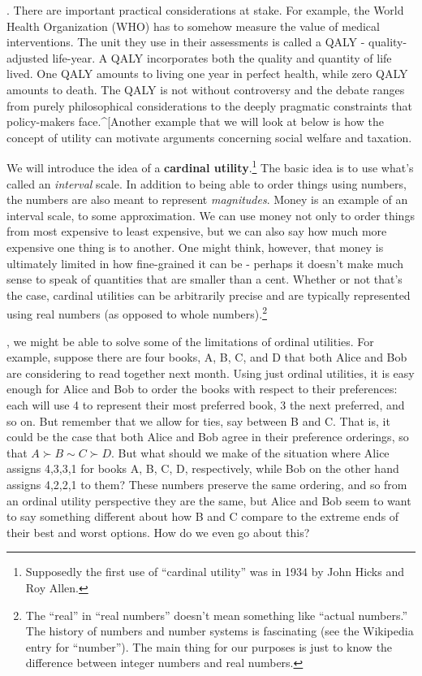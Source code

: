 \documentclass[]{tufte-book}
\begin{document}
. There are important practical considerations at stake. For example, the World Health Organization (WHO) has to somehow measure the value of medical interventions. The unit they use in their assessments is called a QALY - quality-adjusted life-year. A QALY incorporates both the quality and quantity of life lived. One QALY amounts to living one year in perfect health, while zero QALY amounts to death. The QALY is not without controversy and the debate ranges from purely philosophical considerations to the deeply pragmatic constraints that policy-makers face.\^{}{[}Another example that we will look at below is how the concept of utility can motivate arguments concerning social welfare and taxation.

We will introduce the idea of a \textbf{cardinal utility}.\footnote{Supposedly the first use of ``cardinal utility'' was in 1934 by John Hicks and Roy Allen.} The basic idea is to use what's called an \emph{interval} scale. In addition to being able to order things using numbers, the numbers are also meant to represent \emph{magnitudes}. Money is an example of an interval scale, to some approximation. We can use money not only to order things from most expensive to least expensive, but we can also say how much more expensive one thing is to another. One might think, however, that money is ultimately limited in how fine-grained it can be - perhaps it doesn't make much sense to speak of quantities that are smaller than a cent. Whether or not that's the case, cardinal utilities can be arbitrarily precise and are typically represented using real numbers (as opposed to whole numbers).\footnote{The ``real'' in ``real numbers'' doesn't mean something like ``actual numbers.'' The history of numbers and number systems is fascinating (see the Wikipedia entry for ``number''). The main thing for our purposes is just to know the difference between integer numbers and real numbers.}

, we might be able to solve some of the limitations of ordinal utilities. For example, suppose there are four books, A, B, C, and D that both Alice and Bob are considering to read together next month. Using just ordinal utilities, it is easy enough for Alice and Bob to order the books with respect to their preferences: each will use 4 to represent their most preferred book, 3 the next preferred, and so on. But remember that we allow for ties, say between B and C. That is, it could be the case that both Alice and Bob agree in their preference orderings, so that \(A\succ B\sim C \succ D\). But what should we make of the situation where Alice assigns 4,3,3,1 for books A, B, C, D, respectively, while Bob on the other hand assigns 4,2,2,1 to them? These numbers preserve the same ordering, and so from an ordinal utility perspective they are the same, but Alice and Bob seem to want to say something different about how B and C compare to the extreme ends of their best and worst options. How do we even go about this?
\end{document}
